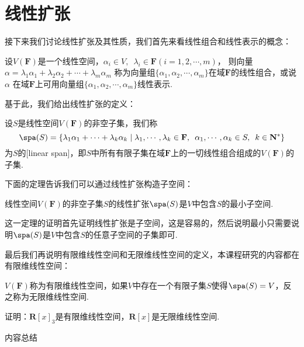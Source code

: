 \section{线性扩张}
接下来我们讨论线性扩张及其性质，我们首先来看线性组合和线性表示的概念：
\begin{definition}
    设$V(\mathbf{F})$是一个线性空间，$\alpha_i\in V,\enspace\lambda_i\in \mathbf{F}(i=1,2,\cdots,m)$，
    则向量$\alpha=\lambda_1\alpha_1+\lambda_2\alpha_2+\cdots+\lambda_m\alpha_m$
    称为向量组$\{\alpha_1,\alpha_2,\cdots,\alpha_m\}$在域$\mathbf{F}$的线性组合，或说$\alpha$
    在域$\mathbf{F}$上可用向量组$\{\alpha_1,\alpha_2,\cdots,\alpha_m\}$线性表示.
\end{definition}
基于此，我们给出线性扩张的定义：
\begin{definition}
    设$S$是线性空间$V(\mathbf{F})$的非空子集，我们称
    \[ \spa(S)=\{\lambda_1\alpha_1+\cdots+\lambda_k\alpha_k \mid \lambda_1,\cdots,\lambda_k\in\mathbf{F},\enspace\alpha_1,\cdots,\alpha_k\in S,\enspace k\in\mathbf{N^*}\} \]
    为$S$的[linear span]，即$S$中所有有限子集在域$\mathbf{F}$上的一切线性组合组成的$V(\mathbf{F})$的子集.
\end{definition}
下面的定理告诉我们可以通过线性扩张构造子空间：
\begin{theorem}
    线性空间$V(\mathbf{F})$的非空子集$S$的线性扩张$\spa(S)$是$V$中包含$S$的最小子空间.
\end{theorem}
这一定理的证明首先证明线性扩张是子空间，这是容易的，然后说明最小只需要说明$\spa(S)$是$V$中包含$S$的任意子空间的子集即可.

最后我们再说明有限维线性空间和无限维线性空间的定义，本课程研究的内容都在有限维线性空间：
\begin{definition}
    $V(\mathbf{F})$称为有限维线性空间，如果$V$中存在一个有限子集$S$使得$\spa(S)=V$，反之称为无限维线性空间.
\end{definition}
\begin{example}
    证明：$\mathbf{R}[x]_3$是有限维线性空间，$\mathbf{R}[x]$是无限维线性空间.
\end{example}

\vspace{2ex}
\centerline{\heiti \Large 内容总结}

\vspace{2ex}


